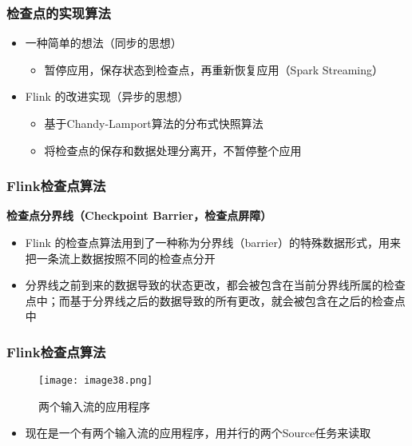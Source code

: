 \documentclass{beamer}
\begin{document}
  \begin{frame}
      \frametitle{检查点的实现算法}
  
      \begin{itemize}
          \item 一种简单的想法（同步的思想）
          \begin{itemize}
              \item 暂停应用，保存状态到检查点，再重新恢复应用（Spark Streaming）
          \end{itemize}
          \item Flink 的改进实现（异步的思想）
          \begin{itemize}
              \item 基于Chandy-Lamport算法的分布式快照算法
              \item 将检查点的保存和数据处理分离开，不暂停整个应用
          \end{itemize}
      \end{itemize}
  
  \end{frame}

  \begin{frame}
      \frametitle{Flink检查点算法}
  
      \textbf{检查点分界线（Checkpoint Barrier，检查点屏障）}

      \begin{itemize}
          \item Flink 的检查点算法用到了一种称为分界线（barrier）的特殊数据形式，用来把一条流上数据按照不同的检查点分开
          \item 分界线之前到来的数据导致的状态更改，都会被包含在当前分界线所属的检查点中；而基于分界线之后的数据导致的所有更改，就会被包含在之后的检查点中
      \end{itemize}
  
  \end{frame}

  \begin{frame}
      \frametitle{Flink检查点算法}

      \begin{figure}
        \centering
        \texttt{[image: image38.png]}
        \caption{两个输入流的应用程序}
      \end{figure}
  
      \begin{itemize}
          \item 现在是一个有两个输入流的应用程序，用并行的两个Source任务来读取
      \end{itemize}
  
  \end{frame}
\end{document}
